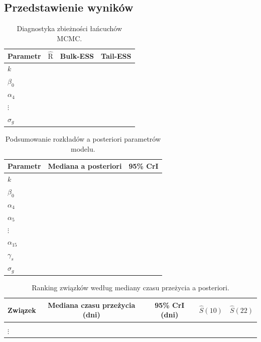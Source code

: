 \documentclass[12pt, a4paper]{article}
\begin{document}
\subsection{Przedstawienie wyników}
\begin{table}[h!]
\centering
\caption{Diagnostyka zbieżności łańcuchów MCMC.}
\begin{tabular}{lccc}
\toprule
\textbf{Parametr} & \textbf{$\mathrm{\hat{R}}$} & \textbf{Bulk-ESS} & \textbf{Tail-ESS} \\
\midrule
$k$ & & & \\
$\beta_0$ & & & \\
$\alpha_4$ & & & \\
$\vdots$ & & & \\
$\sigma_g$ & & & \\
\bottomrule
\end{tabular}
\label{tab:diagnostics}
\end{table}

\begin{table}[h!]
\centering
\caption{Podsumowanie rozkładów a posteriori parametrów modelu.}
\begin{tabular}{lcc}
\toprule
\textbf{Parametr} & \textbf{Mediana a posteriori} & \textbf{95\% CrI} \\
\midrule
$k$ & & \\
$\beta_0$ & & \\
$\alpha_4$ & & \\
$\alpha_5$ & & \\
$\vdots$ & & \\
$\alpha_{15}$ & & \\
$\gamma_s$ & & \\
$\sigma_g$ & & \\
\bottomrule
\end{tabular}
\label{tab:posterior_summary}
\end{table}
\begin{table}[h!]
\centering
\caption{Ranking związków według mediany czasu przeżycia a posteriori.}
\begin{tabular}{lcccc}
\toprule
\textbf{Związek} & \textbf{Mediana czasu przeżycia (dni)} & \textbf{95\% CrI (dni)} & \textbf{$\hat{S}(10)$} & \textbf{$\hat{S}(22)$} \\
\midrule
& & & & \\
$\vdots$ & & & & \\
\bottomrule
\end{tabular}
\label{tab:compound_ranking}
\end{table}


\newpage

\printbibliography[title={Bibliografia}]
\end{document}
